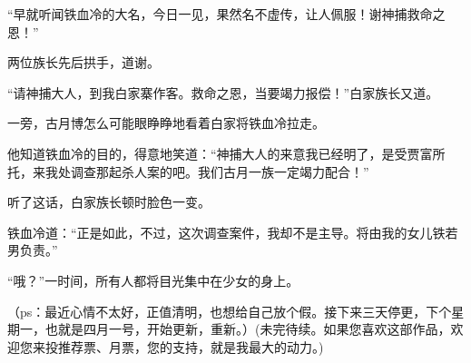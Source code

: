 \begin{this_body}
“早就听闻铁血冷的大名，今日一见，果然名不虚传，让人佩服！谢神捕救命之恩！”

两位族长先后拱手，道谢。

“请神捕大人，到我白家寨作客。救命之恩，当要竭力报偿！”白家族长又道。

一旁，古月博怎么可能眼睁睁地看着白家将铁血冷拉走。

他知道铁血冷的目的，得意地笑道：“神捕大人的来意我已经明了，是受贾富所托，来我处调查那起杀人案的吧。我们古月一族一定竭力配合！”

听了这话，白家族长顿时脸色一变。

铁血冷道：“正是如此，不过，这次调查案件，我却不是主导。将由我的女儿铁若男负责。”

“哦？”一时间，所有人都将目光集中在少女的身上。

（ps：最近心情不太好，正值清明，也想给自己放个假。接下来三天停更，下个星期一，也就是四月一号，开始更新，重新。）(未完待续。如果您喜欢这部作品，欢迎您来投推荐票、月票，您的支持，就是我最大的动力。)

\end{this_body}

